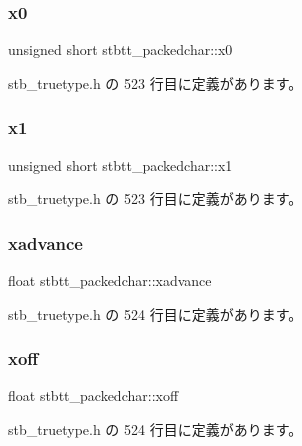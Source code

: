 \subsubsection{\texorpdfstring{x0}{x0}}
{\footnotesize\ttfamily unsigned short stbtt\+\_\+packedchar\+::x0}



 stb\+\_\+truetype.\+h の 523 行目に定義があります。

\mbox{\label{structstbtt__packedchar_a99d371f0261cd13dfd1a179f143175d1}} 
\subsubsection{\texorpdfstring{x1}{x1}}
{\footnotesize\ttfamily unsigned short stbtt\+\_\+packedchar\+::x1}



 stb\+\_\+truetype.\+h の 523 行目に定義があります。

\mbox{\label{structstbtt__packedchar_a28707ae98d1fa946b3390840aeff76ab}} 
\subsubsection{\texorpdfstring{xadvance}{xadvance}}
{\footnotesize\ttfamily float stbtt\+\_\+packedchar\+::xadvance}



 stb\+\_\+truetype.\+h の 524 行目に定義があります。

\mbox{\label{structstbtt__packedchar_adb30c50674c79d32116ae6f94bd5893f}} 
\subsubsection{\texorpdfstring{xoff}{xoff}}
{\footnotesize\ttfamily float stbtt\+\_\+packedchar\+::xoff}



 stb\+\_\+truetype.\+h の 524 行目に定義があります。

